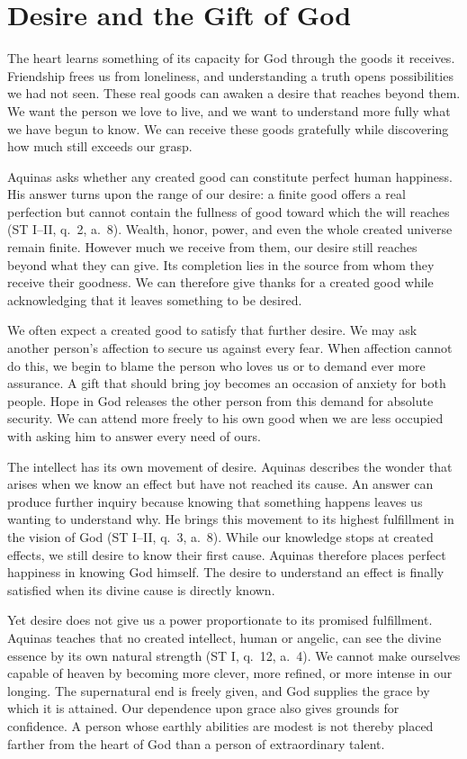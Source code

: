 \section{Desire and the Gift of God}

The heart learns something of its capacity for God through the goods it receives. Friendship frees us from loneliness, and understanding a truth opens possibilities we had not seen. These real goods can awaken a desire that reaches beyond them. We want the person we love to live, and we want to understand more fully what we have begun to know. We can receive these goods gratefully while discovering how much still exceeds our grasp.

Aquinas asks whether any created good can constitute perfect human happiness. His answer turns upon the range of our desire: a finite good offers a real perfection but cannot contain the fullness of good toward which the will reaches (ST I--II, q.~2, a.~8). Wealth, honor, power, and even the whole created universe remain finite. However much we receive from them, our desire still reaches beyond what they can give. Its completion lies in the source from whom they receive their goodness. We can therefore give thanks for a created good while acknowledging that it leaves something to be desired.

We often expect a created good to satisfy that further desire. We may ask another person's affection to secure us against every fear. When affection cannot do this, we begin to blame the person who loves us or to demand ever more assurance. A gift that should bring joy becomes an occasion of anxiety for both people. Hope in God releases the other person from this demand for absolute security. We can attend more freely to his own good when we are less occupied with asking him to answer every need of ours.

The intellect has its own movement of desire. Aquinas describes the wonder that arises when we know an effect but have not reached its cause. An answer can produce further inquiry because knowing that something happens leaves us wanting to understand why. He brings this movement to its highest fulfillment in the vision of God (ST I--II, q.~3, a.~8). While our knowledge stops at created effects, we still desire to know their first cause. Aquinas therefore places perfect happiness in knowing God himself. The desire to understand an effect is finally satisfied when its divine cause is directly known.

Yet desire does not give us a power proportionate to its promised fulfillment. Aquinas teaches that no created intellect, human or angelic, can see the divine essence by its own natural strength (ST I, q.~12, a.~4). We cannot make ourselves capable of heaven by becoming more clever, more refined, or more intense in our longing. The supernatural end is freely given, and God supplies the grace by which it is attained. Our dependence upon grace also gives grounds for confidence. A person whose earthly abilities are modest is not thereby placed farther from the heart of God than a person of extraordinary talent.

